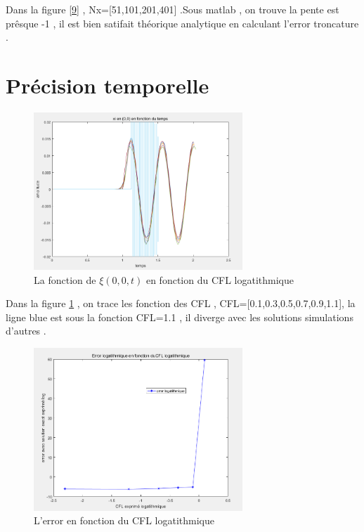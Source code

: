 \documentclass[a4paper,10pt]{report} %
\begin{document}
Dans la figure \ref{9} , Nx=[51,101,201,401] .Sous matlab , on trouve la pente est prêsque -1 , il est bien satifait théorique analytique en calculant l'error troncature  .




\section{Précision temporelle}
\begin{figure}[h]
\centering
\includegraphics[width=0.7\textwidth]{fig/figure12.png}
\caption{La fonction de $\xi(0,0,t)$ en fonction du CFL logatithmique}
\label{12}
\end{figure}

Dans la figure \ref{12} , on trace les fonction des CFL , CFL=[0.1,0.3,0.5,0.7,0.9,1.1], la ligne blue est sous la fonction CFL=1.1 , il diverge avec les solutions simulations d'autres .

\begin{figure}[h]
\centering
\includegraphics[width=0.7\textwidth]{fig/figure11.png}
\caption{L'error en fonction du CFL logatithmique}
\label{11}
\end{figure}
\end{document}
